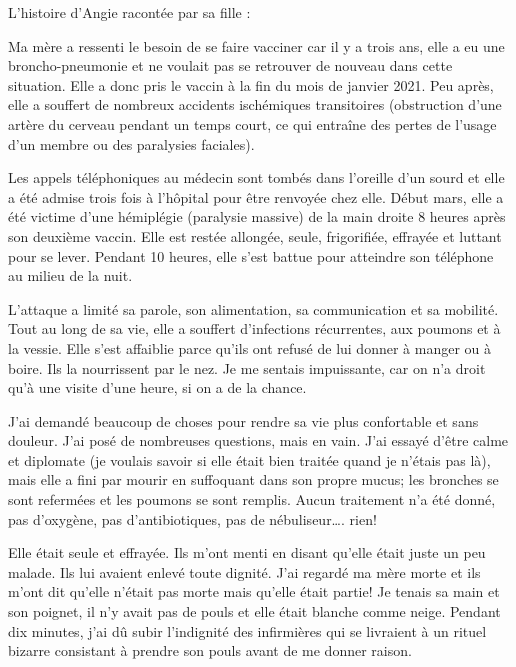 L'histoire d'Angie racontée par sa fille :

Ma mère a ressenti le besoin de se faire vacciner car il y a trois ans, elle a
eu une broncho-pneumonie et ne voulait pas se retrouver de nouveau dans cette
situation. Elle a donc pris le vaccin à la fin du mois de janvier 2021. Peu
après, elle a souffert de nombreux accidents ischémiques transitoires
(obstruction d’une artère du cerveau pendant un temps court, ce qui entraîne des
pertes de l’usage d’un membre ou des paralysies faciales).

Les appels téléphoniques au médecin sont tombés dans l'oreille d'un sourd et
elle a été admise trois fois à l'hôpital pour être renvoyée chez elle. Début
mars, elle a été victime d'une hémiplégie (paralysie massive) de la main droite
8 heures après son deuxième vaccin. Elle est restée allongée, seule,
frigorifiée, effrayée et luttant pour se lever. Pendant 10 heures, elle s'est
battue pour atteindre son téléphone au milieu de la nuit.

L'attaque a limité sa parole, son alimentation, sa communication et sa
mobilité. Tout au long de sa vie, elle a souffert d'infections récurrentes, aux
poumons et à la vessie. Elle s'est affaiblie parce qu'ils ont refusé de lui
donner à manger ou à boire. Ils la nourrissent par le nez. Je me sentais
impuissante, car on n'a droit qu'à une visite d'une heure, si on a de la chance.

J'ai demandé beaucoup de choses pour rendre sa vie plus confortable et sans
douleur. J'ai posé de nombreuses questions, mais en vain. J'ai essayé d'être
calme et diplomate (je voulais savoir si elle était bien traitée quand je
n'étais pas là), mais elle a fini par mourir en suffoquant dans son propre
mucus; les bronches se sont refermées et les poumons se sont remplis. Aucun
traitement n'a été donné, pas d'oxygène, pas d'antibiotiques, pas de
nébuliseur…. rien!

Elle était seule et effrayée. Ils m'ont menti en disant qu'elle était juste un
peu malade. Ils lui avaient enlevé toute dignité. J'ai regardé ma mère morte et
ils m'ont dit qu'elle n'était pas morte mais qu'elle était partie! Je tenais sa
main et son poignet, il n'y avait pas de pouls et elle était blanche comme
neige. Pendant dix minutes, j'ai dû subir l'indignité des infirmières qui se
livraient à un rituel bizarre consistant à prendre son pouls avant de me donner
raison.

